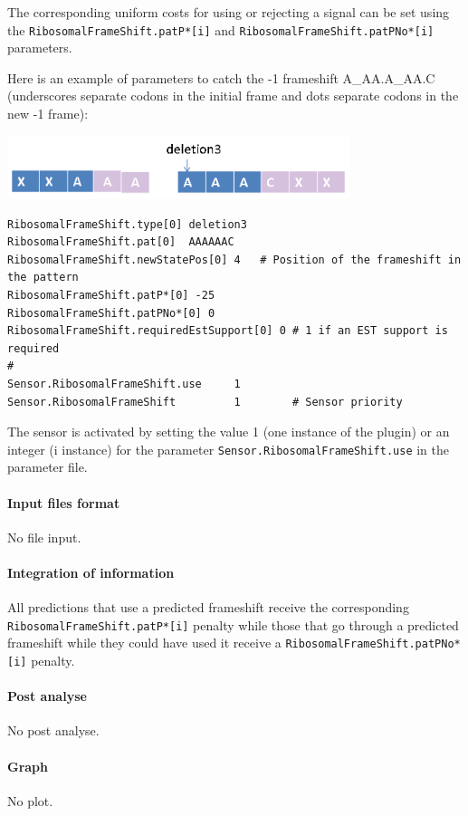 The corresponding uniform costs for using or rejecting a signal can be set using the \texttt{RibosomalFrame\-Shift.patP*[i]} 
and \texttt{RibosomalFrameShift.patPNo*[i]} parameters.


Here is an example of parameters to catch the -1 frameshift A\_AA.A\_AA.C 
(underscores separate codons in the initial frame and dots separate codons in the new -1 frame):

\includegraphics[width=10cm]{ExampleFS.png}

\begin{Verbatim}[fontsize=\small]
RibosomalFrameShift.type[0] deletion3 
RibosomalFrameShift.pat[0]  AAAAAAC      
RibosomalFrameShift.newStatePos[0] 4   # Position of the frameshift in the pattern
RibosomalFrameShift.patP*[0] -25
RibosomalFrameShift.patPNo*[0] 0
RibosomalFrameShift.requiredEstSupport[0] 0 # 1 if an EST support is required
#
Sensor.RibosomalFrameShift.use     1
Sensor.RibosomalFrameShift         1        # Sensor priority
\end{Verbatim}

The sensor is activated by setting the value 1 (one instance of the
plugin) or an integer (i instance) for the parameter
\texttt{Sensor.RibosomalFrameShift.use} in the parameter file.

\paragraph{Input files format}

No file input.

\paragraph{Integration of information}

All predictions that use a predicted frameshift receive the
corresponding \texttt{Ribosomal\-FrameShift.patP*[i]} penalty while those that go through
a predicted frameshift while they could have used it receive a
\texttt{RibosomalFrameShift.patPNo*[i]} penalty.

\paragraph{Post analyse}

No post analyse.

\paragraph{Graph}

No plot.
